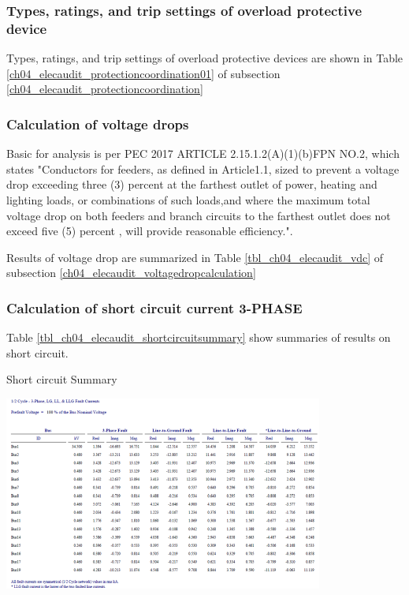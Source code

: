 \subsubsection{Types, ratings, and trip settings of overload protective device}
Types, ratings, and trip settings of overload protective devices are shown in Table \ref{ch04_elecaudit_protectioncoordination01} of subsection \ref{ch04_elecaudit_protectioncoordination}

%

\subsubsection{Calculation of voltage drops }
Basic for analysis is per PEC 2017 ARTICLE 2.15.1.2(A)(1)(b)FPN NO.2, which states "Conductors  for feeders, as defined in Article1.1, sized to prevent a voltage drop exceeding three 
(3) percent at the farthest outlet of power, heating and lighting loads, or combinations of such
loads,and where the maximum total voltage drop on both feeders and branch circuits to the  
farthest outlet does not exceed five (5) percent , will provide reasonable efficiency.".

Results of voltage drop are summarized in Table \ref{tbl_ch04_elecaudit_vdc} of subsection \ref{ch04_elecaudit_voltagedropcalculation}
%


\subsubsection{Calculation of short circuit current 3-PHASE}
Table \ref{tbl_ch04_elecaudit_shortcircuitsummary} show summaries of results on short circuit.


\begin{table}
	\caption{Short circuit Summary}
	\label{tbl_ch04_elecaudit_shortcircuitsummary}
	\includegraphics[width=\textwidth]{tables/tbl_ch04_elecaudit_shortcircuitsummary} \\	
\end{table}


